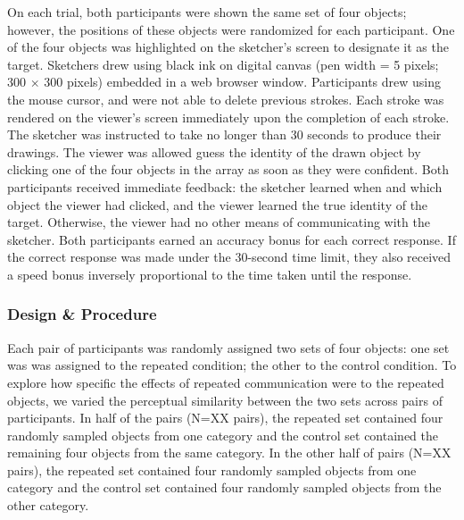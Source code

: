 \documentclass[10pt,letterpaper]{article}
\begin{document}
On each trial, both participants were shown the same set of four objects; however, the positions of these objects were randomized for each participant. 
One of the four objects was highlighted on the sketcher's screen to designate it as the target.
Sketchers drew using black ink on digital canvas (pen width = 5 pixels; 300 $\times$ 300 pixels) embedded in a web browser window. 
Participants drew using the mouse cursor, and were not able to delete previous strokes. 
Each stroke was rendered on the viewer's screen immediately upon the completion of each stroke.
The sketcher was instructed to take no longer than 30 seconds to produce their drawings. 
The viewer was allowed guess the identity of the drawn object by clicking one of the four objects in the array as soon as they were confident. 
Both participants received immediate feedback: the sketcher learned when and which object the viewer had clicked, and the viewer learned the true identity of the target. 
Otherwise, the viewer had no other means of communicating with the sketcher. 
Both participants earned an accuracy bonus for each correct response. 
If the correct response was made under the 30-second time limit, they also received a speed bonus inversely proportional to the time taken until the response.



\subsubsection{Design \& Procedure} 

Each pair of participants was randomly assigned two sets of four objects: one set was was assigned to the repeated condition; the other to the control condition.
To explore how specific the effects of repeated communication were to the repeated objects, we varied the perceptual similarity between the two sets across pairs of participants. 
In half of the pairs (N=XX pairs), the repeated set contained four randomly sampled objects from one category and the control set contained the remaining four objects from the same category. 
In the other half of pairs (N=XX pairs), the repeated set contained four randomly sampled objects from one category and the control set contained four randomly sampled objects from the other category.
\end{document}
